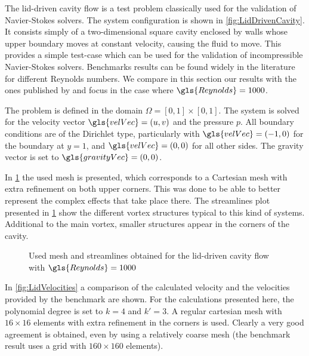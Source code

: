 The lid-driven cavity flow is a test problem classically used for the validation of Navier-Stokes solvers. The system configuration is shown in \cref{fig:LidDrivenCavity}. It consists simply of a two-dimensional square cavity  enclosed by walls whose upper boundary moves at constant velocity, causing the fluid to move. This provides a simple test-case which can be used for the validation of incompressible Navier-Stokes solvers. Benchmarks results can be found widely in the literature for different Reynolds numbers. We compare in this section our results with the ones published by \cite{botellaBenchmarkSpectralResults1998} and focus in the case where $\gls{Reynolds} = 1000$. 

The problem is defined in the domain $\Omega = [0,1]\times [0,1]$. The system is solved for the velocity vector $\gls{velVec} = (u,v)$ and the pressure $p$. All boundary conditions are of the Dirichlet type, particularly with $\gls{velVec} = (-1,0)$ for the boundary at $y = 1$, and $\gls{velVec} = (0,0)$ for all other sides. The gravity vector is set to $\gls{gravityVec} = (0,0)$. 

 In \cref{fig:LiddrivenMesh} the used mesh is presented, which corresponds to a Cartesian mesh with extra refinement on both upper corners. This was done to be able to better represent the complex effects that take place there.  The streamlines plot presented in \cref{fig:LiddrivenMesh} show the different vortex structures typical to this kind of systems. Additional to the main vortex, smaller structures appear in the corners of the cavity. 
	
	\begin{figure}[t]
		\centering
		\pgfplotsset{width=0.35 \textwidth, compat=1.3}	
		\caption{Used mesh and streamlines obtained for the lid-driven cavity flow with $\gls{Reynolds} = 1000$} \label{fig:LiddrivenMesh}
	\end{figure}

In \cref{fig:LidVelocities} a comparison of the calculated velocity and the velocities provided by the benchmark are shown. For the calculations presented here, the polynomial degree is set to $k = 4$ and $k' = 3$. A regular cartesian mesh with $16\times16$ elements with extra refinement in the corners is used. Clearly a very good agreement is obtained, even by using a relatively coarse mesh (the benchmark result uses a grid with $160\times160$ elements). 

